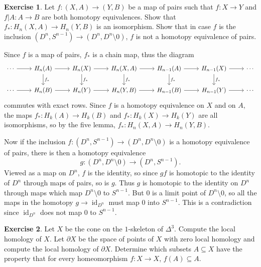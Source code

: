 \documentclass[10pt]{article}
\newcommand{\id}{\operatorname{id}}
\theoremstyle{definition}
\newtheorem{exer}{Exercise}
\begin{document}
\begin{exer}
Let $f: (X, A) \to (Y, B)$ be a map of pairs such that $f: X \to Y$ and $f|A: A \to B$ are both homotopy equivalences.
Show that $f_*: H_n(X, A) \to H_n(Y, B)$ is an isomorphism.
Show that in case $f$ is the inclusion $(D^n, S^{n-1}) \to (D^n, D^n \setminus 0)$, $f$ is not a homotopy equivalence of pairs.
\end{exer}

Since $f$ is a map of pairs, $f_*$ is a chain map, thus the diagram
$$\begin{tikzcd}
\cdots \arrow[r]& H_n(A) \arrow[d,"f_*"] \arrow[r]& H_n(X) \arrow[d,"f_*"] \arrow[r]& H_n(X, A) \arrow[d,"f_*"] \arrow[r]& H_{n-1}(A) \arrow[d,"f_*"] \arrow[r]& H_{n-1}(X) \arrow[d,"f_*"] \arrow[r]&\cdots \\
\cdots \arrow[r]& H_n(B) \arrow[r]& H_n(Y) \arrow[r]& H_n(Y, B) \arrow[r]& H_{n-1}(B) \arrow[r]& H_{n-1}(Y) \arrow[r]&\cdots
\end{tikzcd}$$
commutes with exact rows.
Since $f$ is a homotopy equivalence on $X$ and on $A$, the maps $f_*: H_k(A) \to H_k(B)$ and $f_*: H_k(X) \to H_k(Y)$ are all isomorphisms, so by the five lemma, $f_*: H_n(X, A) \to H_n(Y, B)$.

Now if the inclusion $f: (D^n, S^{n-1}) \to (D^n, D^n \setminus 0)$ is a homotopy equivalence of pairs, there is then a homotopy equivalence
$$g: (D^n, D^n \setminus 0) \to (D^n, S^{n-1}).$$
Viewed as a map on $D^n$, $f$ is the identity, so since $gf$ is homotopic to the identity of $D^n$ through maps of pairs, so is $g$. Thus $g$ is homotopic to the identity on $D^n$ through maps which map $D^n \setminus 0$ to $S^{n-1}$.
But $0$ is a limit point of $D^n \setminus 0$, so all the maps in the homotopy $g \to \id_{D^n}$ must map $0$ into $S^{n-1}$.
This is a contradiction since $\id_{D^n}$ does not map $0$ to $S^{n-1}$.

\begin{exer}
Let $X$ be the cone on the $1$-skeleton of $\Delta^3$. Compute the local homology of $X$.
Let $\partial X$ be the space of points of $X$ with zero local homology and compute the local homology of $\partial X$.
Determine which subsets $A \subseteq X$ have the property that for every homeomorphism $f: X \to X$, $f(A) \subseteq A$.
\end{exer}
\end{document}
